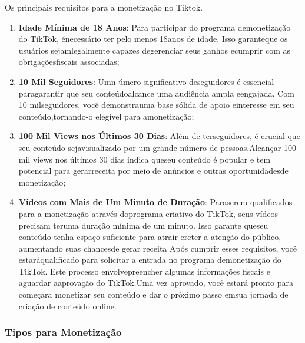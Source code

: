 Os principais requisitos para a monetização no Tiktok.

\begin{enumerate}
    \item \textbf{Idade Mínima de 18 Anos}: Para participar do programa demonetização do TikTok, énecessário ter pelo menos 18anos de idade. Isso garanteque os usuários sejamlegalmente capazes degerenciar seus ganhos ecumprir com as obrigaçõesfiscais associadas;
    \item \textbf{10 Mil Seguidores}: Umn úmero significativo deseguidores é essencial paragarantir que seu conteúdoalcance uma audiência ampla eengajada. Com 10 milseguidores, você demonstrauma base sólida de apoio einteresse em seu conteúdo,tornando-o elegível para amonetização;
    \item \textbf{100 Mil Views nos Últimos 30 Dias}: Além de terseguidores, é crucial que seu conteúdo sejavisualizado por um grande número de pessoas.Alcançar 100 mil views nos últimos 30 dias indica queseu conteúdo é popular e tem potencial para gerarreceita por meio de anúncios e outras oportunidadesde monetização;
    \item \textbf{Vídeos com Mais de Um Minuto de Duração}: Paraserem qualificados para a monetização através doprograma criativo do TikTok, seus vídeos precisam teruma duração mínima de um minuto. Isso garante queseu conteúdo tenha espaço suficiente para atrair ereter a atenção do público, aumentando suas chancesde gerar receita Após cumprir esses requisitos, você estaráqualificado para solicitar a entrada no programa demonetização do TikTok. Este processo envolvepreencher algumas informações fiscais e aguardar aaprovação do TikTok.Uma vez aprovado, você estará pronto para começara monetizar seu conteúdo e dar o próximo passo emsua jornada de criação de conteúdo online.
    \end{enumerate}


\subsubsection{Tipos para Monetização}

